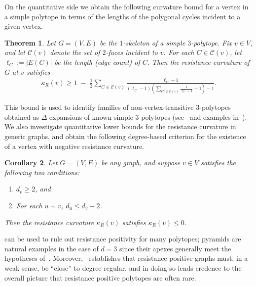 \documentclass[11pt,a4paper]{amsart}
\newcommand{\resistance}[1]{\kappa_R\left({#1}\right)}
\newtheorem{theorem}{Theorem}[section]
\newtheorem{corollary}[theorem]{Corollary}
\begin{document}
On the quantitative side we obtain the following curvature bound for a vertex in a simple polytope in terms of the lengths of the polygonal cycles incident to a given vertex.

\begin{theorem}\label{thm:curvature-bound-intro}
    Let $G=(V,E)$ be the $1$-skeleton of a simple $3$-polytope. Fix $v\in V$, and let $\mathcal{C
    }(v)$ denote the set of $2$-faces incident to $v$. For each $C\in\mathcal{C}(v)$, let $\ell_C := |E(C)|$ be the length (edge count) of $C$. Then the resistance curvature of $G$ at $v$ satisfies
        \begin{align*}
            \resistance{v} \geq
            1 \;-\; \frac{1}{2}\sum_{C\in\mathcal{C}(v)}
            \frac{\ell_C-1}{
                (\ell_C-1)\!\left(\sum_{C'\in\mathcal{C}(v)}\frac{1}{\ell_{C'}-1}+1\right)-1}.
        \end{align*}
\end{theorem}

This bound is used to identify families of non-vertex-transitive $3$-polytopes obtained as $\Delta$-expansions of known simple $3$-polytopes (see~ and examples in~). We also investigate quantitative lower bounds for the resistance curvature in generic graphs, and obtain the following degree-based criterion for the existence of a vertex with negative resistance curvature.

\begin{corollary}\label{cor:intro-resistance-curv-lowerbound}
    Let $G=(V,E)$ be any graph, and suppose $v\in V$ satisfies the following two conditions:
        \begin{enumerate}[label={\normalfont (\roman*)}]
            \item $d_v\geq 2$, and
            \item For each $u\sim v$, $d_u\leq d_v -2$.
        \end{enumerate}
    Then the resistance curvature $\resistance{v}$ satisfies $\resistance{v}\leq 0$.
\end{corollary}

 can be used to rule out resistance positivity for many polytopes; pyramids are natural examples in the case of $d=3$ since their apexes generally meet the hypotheses of~. Moreover,~ establishes that resistance positive graphs must, in a weak sense, be ``close'' to degree regular, and in doing so lends credence to the overall picture that resistance positive polytopes are often rare.
\end{document}
